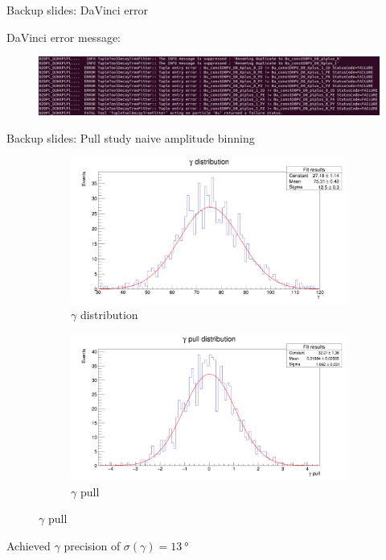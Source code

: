\documentclass{beamer}
\begin{document}
\begin{frame}{Backup slides: DaVinci error}
  \begin{center}
    DaVinci error message:
  \end{center}
  \begin{figure}
    \includegraphics[width = 1\textwidth]{DaVinciError.png}
  \end{figure}
\end{frame}

\begin{frame}{Backup slides: Pull study naive amplitude binning}
  \begin{figure}
    \centering
    \vspace{-0.2cm}
    \begin{subfigure}{0.5\textwidth}
      \includegraphics[width = 1.0\textwidth]{GammaDistribution8BinsFixedWidth.png}
      \caption{$\gamma$ distribution}
    \end{subfigure}%
    \begin{subfigure}{0.5\textwidth}
      \includegraphics[width = 1.0\textwidth]{GammaPull8BinsFixedWidth.png}
      \caption{$\gamma$ pull}
    \end{subfigure}
  \end{figure}
  \begin{center}
    Achieved $\gamma$ precision of $\sigma(\gamma) = \SI{13}{\degree}$
  \end{center}
\end{frame}
\end{document}
